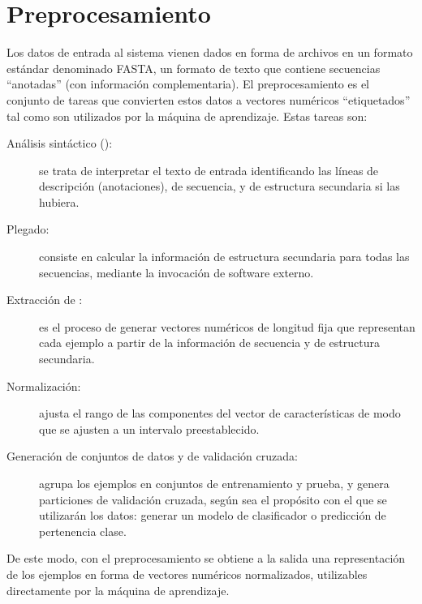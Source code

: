 
%
%
%
\section{Preprocesamiento}
%
Los datos de entrada al sistema vienen dados en forma de archivos en
un formato estándar denominado FASTA, un formato de texto que contiene
secuencias ``anotadas'' (con información complementaria).  El
preprocesamiento es el conjunto de tareas que convierten estos datos a
vectores numéricos ``etiquetados'' tal como son utilizados por la
máquina de aprendizaje. Estas tareas son:
%
\begin{description}
\item[Análisis sintáctico ():] se trata de interpretar el
  texto de entrada identificando las líneas de descripción
  (anotaciones), de secuencia, y de estructura secundaria si las
  hubiera.
\item[Plegado:] consiste en calcular la información de estructura
  secundaria para todas las secuencias, mediante la invocación de
  software externo.
\item[Extracción de :] es el proceso de generar vectores
  numéricos de longitud fija que representan cada ejemplo a partir de
  la información de secuencia y de estructura secundaria.
\item[Normalización:] ajusta el rango de las componentes del vector de
  características de modo que se ajusten a un intervalo
  preestablecido.
\item[Generación de conjuntos de datos y de validación cruzada:]
  agrupa los ejemplos en conjuntos de entrenamiento y prueba, y genera
  particiones de validación cruzada, según sea el propósito con el que
  se utilizarán los datos: generar un modelo de clasificador o
  predicción de pertenencia clase.
\end{description}
%
De este modo, con el preprocesamiento se obtiene a la salida una
representación de los ejemplos en forma de vectores numéricos
normalizados, utilizables directamente por la máquina de aprendizaje.
